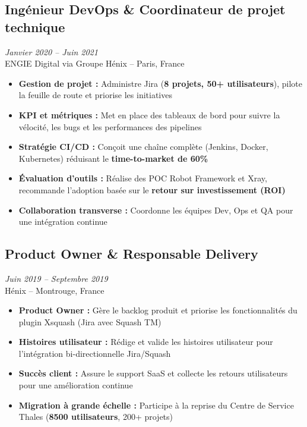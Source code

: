 \documentclass[11pt,a4paper]{article}
\newcommand{\highlight}[1]{\textcolor{primaryblue}{\textbf{#1}}}
\newcommand{\keypoint}[1]{\textbf{#1}}
\begin{document}
\subsection*{Ingénieur DevOps \& Coordinateur de projet technique} \hfill \textit{\color{mediumgray}Janvier 2020 -- Juin 2021}\\
ENGIE Digital via Groupe Hénix -- Paris, France
\begin{itemize}[leftmargin=22pt]
    \item \highlight{Gestion de projet :} Administre Jira (\keypoint{8 projets, 50+ utilisateurs}), pilote la feuille de route et priorise les initiatives
    \item \highlight{KPI et métriques :} Met en place des tableaux de bord pour suivre la vélocité, les bugs et les performances des pipelines
    \item \highlight{Stratégie CI/CD :} Conçoit une chaîne complète (Jenkins, Docker, Kubernetes) réduisant le \keypoint{time-to-market de 60\%}
    \item \highlight{Évaluation d'outils :} Réalise des POC Robot Framework et Xray, recommande l'adoption basée sur le \highlight{retour sur investissement (ROI)}
    \item \highlight{Collaboration transverse :} Coordonne les équipes Dev, Ops et QA pour une intégration continue
\end{itemize}

\subsection*{Product Owner \& Responsable Delivery} \hfill \textit{\color{mediumgray}Juin 2019 -- Septembre 2019}\\
Hénix -- Montrouge, France
\begin{itemize}[leftmargin=22pt]
    \item \highlight{Product Owner :} Gère le backlog produit et priorise les fonctionnalités du plugin Xsquash (Jira avec Squash TM)
    \item \highlight{Histoires utilisateur :} Rédige et valide les histoires utilisateur pour l'intégration bi-directionnelle Jira/Squash
    \item \highlight{Succès client :} Assure le support SaaS et collecte les retours utilisateurs pour une amélioration continue
    \item \highlight{Migration à grande échelle :} Participe à la reprise du Centre de Service Thales (\keypoint{8500 utilisateurs}, 200+ projets)
\end{itemize}
\end{document}
